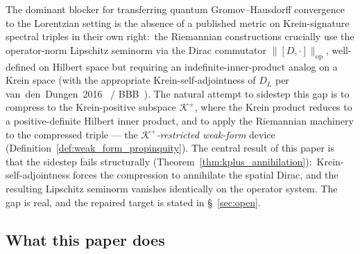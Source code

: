 \documentclass[11pt,a4paper]{article}
\theoremstyle{plain}
\theoremstyle{definition}
\newcommand{\Krein}{\mathcal{K}}
\newcommand{\opnorm}[1]{\lVert #1 \rVert_{\mathrm{op}}}
\newcommand{\DL}{D_{L}}
\newcommand{\Kplus}{\Krein^{+}}
\begin{document}
The dominant blocker for transferring quantum Gromov--Hausdorff
convergence~\cite{latremoliere_metric_st_2017,latremoliere2018,vs2021_jgp}
to the Lorentzian setting is the absence of a published metric on
Krein-signature spectral triples in their own right:\ the Riemannian
constructions crucially use the operator-norm Lipschitz seminorm via
the Dirac commutator $\opnorm{[D, \cdot]}$, well-defined on Hilbert
space but requiring an indefinite-inner-product analog on a Krein
space (with the appropriate Krein-self-adjointness of $\DL$ per
van~den~Dungen~2016~\cite{vandungen2016} /
BBB~\cite{bizi_brouder_besnard2018}). The natural attempt to sidestep
this gap is to compress to the Krein-positive subspace $\Kplus$,
where the Krein product reduces to a positive-definite Hilbert inner
product, and to apply the Riemannian machinery to the compressed
triple — the \emph{$\Kplus$-restricted weak-form} device
(Definition~\ref{def:weak_form_propinquity}). The central result of
this paper is that the sidestep fails structurally
(Theorem~\ref{thm:kplus_annihilation}):\ Krein-self-adjointness
forces the compression to annihilate the spatial Dirac, and the
resulting Lipschitz seminorm vanishes identically on the operator
system. The gap is real, and the repaired target is stated in
\S~\ref{sec:open}.

\subsection{What this paper does}\label{sec:what_this_paper_does}
\end{document}
